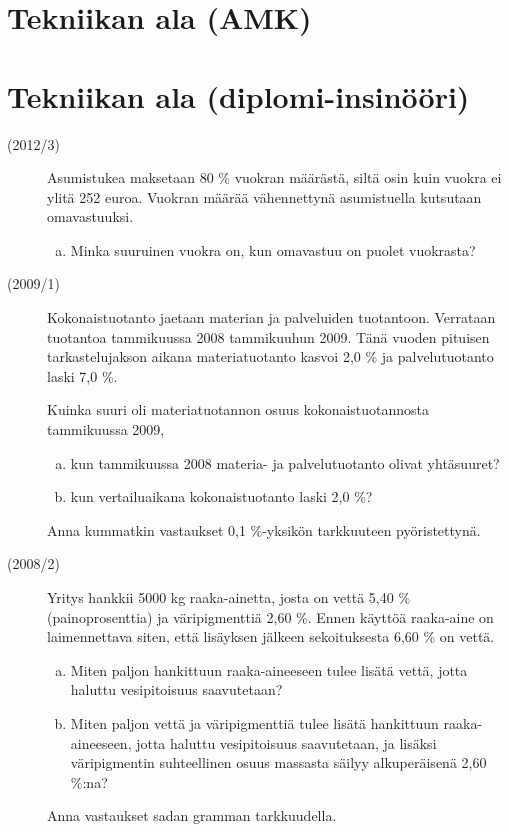 \section{Tekniikan ala (AMK)}

\section{Tekniikan ala (diplomi-insinööri)}
\begin{description}
	\item[(2012/3)] Asumistukea maksetaan 80 \% vuokran määrästä, siltä osin kuin vuokra ei ylitä 252 euroa. Vuokran määrää vähennettynä asumistuella kutsutaan omavastuuksi.
		\begin{enumerate}[(a)]
			\item Minka suuruinen vuokra on, kun omavastuu on puolet vuokrasta?
		\end{enumerate}
	
	\item[(2009/1)] Kokonaistuotanto jaetaan materian ja palveluiden tuotantoon. Verrataan tuotantoa tammikuussa 2008 tammikuuhun 2009. Tänä vuoden pituisen tarkastelujakson aikana materiatuotanto kasvoi 2,0 \% ja palvelutuotanto laski 7,0 \%.
	
	Kuinka suuri oli materiatuotannon osuus kokonaistuotannosta tammikuussa 2009,
	\begin{enumerate}[(a)]
		\item kun tammikuussa 2008 materia- ja palvelutuotanto olivat yhtäsuuret?
		\item kun vertailuaikana kokonaistuotanto laski 2,0 \%?
	\end{enumerate}
	Anna kummatkin vastaukset 0,1 \%-yksikön tarkkuuteen pyöristettynä.

	\item[(2008/2)] Yritys hankkii 5000 kg raaka-ainetta, josta on vettä 5,40 \% (painoprosenttia) ja väripigmenttiä 2,60 \%. Ennen käyttöä raaka-aine on laimennettava siten, että lisäyksen jälkeen sekoituksesta 6,60 \% on vettä.
	
	\begin{enumerate}[(a)]
		\item Miten paljon hankittuun raaka-aineeseen tulee lisätä vettä, jotta haluttu vesipitoisuus saavutetaan?
		\item Miten paljon vettä ja väripigmenttiä tulee lisätä hankittuun raaka-aineeseen, jotta haluttu vesipitoisuus saavutetaan, ja lisäksi väripigmentin suhteellinen osuus massasta säilyy alkuperäisenä 2,60 \%:na?
	\end{enumerate}
	Anna vastaukset sadan gramman tarkkuudella.


\end{description}
